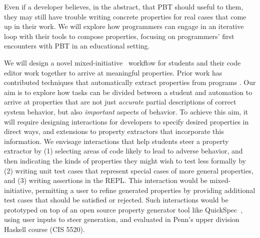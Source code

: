 
%
Even if a developer believes, in the abstract, that PBT should useful
to them, they may still have trouble writing concrete properties
for real cases that come up in their work. We will explore how programmers can engage in an iterative loop with their tools to compose properties, focusing on programmers' first encounters with PBT in an educational setting.

We will design a novel mixed-initiative~\cite{ref:allen1999mixed} workflow for
students and their code editor work together to arrive at
meaningful properties. Prior work has contributed techniques that automatically
extract properties from programs
\cite[etc.]{ref:ammons2002mining, ref:le2018deep, ref:claessen2010quickspec,
smith_discovering_2017}. Our aim is to explore how tasks can be divided between a student and automation to arrive at properties that
are not just {\em accurate} partial descriptions of correct system behavior, but
also {\em important} aspects of behavior. To achieve this aim, it will require
designing interactions for developers to specify desired properties in direct
ways, and extensions to property extractors that incorporate this information. We envisage
interactions that help students steer a property extractor by (1) selecting areas of code likely to lead to adverse behavior,
and then indicating the kinds of properties they might wish to test less formally by (2)
writing unit test cases that represent special cases of more general
properties, and (3) writing assertions in the REPL. This interaction would be mixed-initiative, permitting a user to refine generated properties by providing additional test cases that should be satisfied or rejected. Such interactions would be prototyped on top of an open source property generator tool like QuickSpec~\cite{ref:claessen2010quickspec}, using user inputs to steer generation, and evaluated in Penn's upper division Haskell
course (CIS 5520). 

